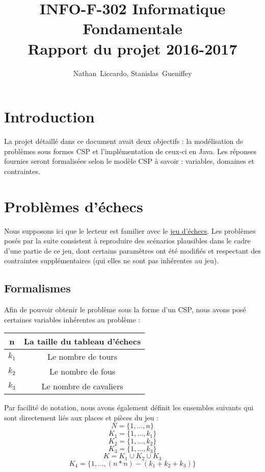 \documentclass[a4paper]{article}
\title{INFO-F-302 Informatique Fondamentale \\ Rapport du projet 2016-2017}
\author{Nathan~Liccardo, Stanislas~Gueniffey}
\begin{document}
\maketitle

\section{Introduction}
La projet détaillé dans ce document avait deux objectifs : la modélisation de problèmes sous formes CSP et l'implémentation de ceux-ci en Java. Les réponses fournies seront formalisées selon le modèle CSP à savoir : variables, domaines et contraintes.

\section{Problèmes d'échecs}
Nous supposons ici que le lecteur est familier avec le \href{https://fr.wikipedia.org/wiki/%C3%89checs}{jeu d'échecs}. Les problèmes posés par la suite consistent à reproduire des scénarios plausibles dans le cadre d'une partie de ce jeu, dont certains paramètres ont été modifiés et respectant des contraintes supplémentaires (qui elles ne sont pas inhérentes au jeu).

\subsection{Formalismes}
Afin de pouvoir obtenir le problème sous la forme d'un CSP, nous avons posé certaines variables inhérentes au problème : 
\begin{center}
\begin{tabular}{|c|c|}
\hline
n & La taille du tableau d'échecs \\
\hline
$k_1$ & Le nombre de tours \\
\hline
$k_2$ & Le nombre de fous \\
\hline
$k_3$ & Le nombre de cavaliers  \\
\hline
\end{tabular}
\end{center}
Par facilité de notation, nous avons également définit les ensembles suivants qui sont directement liés aux places et pièces du jeu : 
\begin{equation*}
N = \{1,\ldots,n\}
\end{equation*}
\begin{equation*}
K_1 = \{ 1,\ldots,k_1 \}
\end{equation*}
\begin{equation*}
K_2 = \{ 1,\ldots,k_2 \}
\end{equation*}
\begin{equation*}
K_3 = \{ 1,\ldots,k_3 \}
\end{equation*}
\begin{equation*}
K = K_1 \cup K_2 \cup K_3
\end{equation*}
\begin{equation*}
K_4 = \{ 1,\ldots,(n*n)-(k_1+k_2+k_3) \}
\end{equation*}
\end{document}
